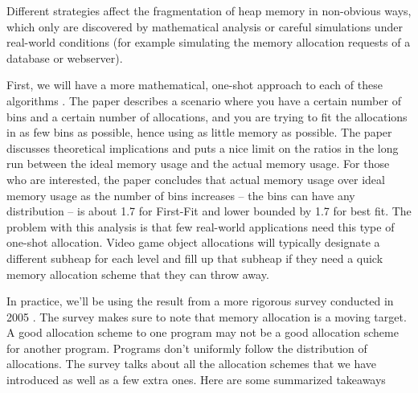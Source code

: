 Different strategies affect the fragmentation of heap memory in non-obvious ways, which only are discovered by mathematical analysis or careful simulations under real-world conditions (for example simulating the memory allocation requests of a database or webserver).

First, we will have a more mathematical, one-shot approach to each of these algorithms \cite{Garey:1972:WAM:800152.804907}.
The paper describes a scenario where you have a certain number of bins and a certain number of allocations, and you are trying to fit the allocations in as few bins as possible, hence using as little memory as possible.
The paper discusses theoretical implications and puts a nice limit on the ratios in the long run between the ideal memory usage and the actual memory usage.
For those who are interested, the paper concludes that actual memory usage over ideal memory usage as the number of bins increases -- the bins can have any distribution -- is about 1.7 for First-Fit and lower bounded by 1.7 for best fit.
The problem with this analysis is that few real-world applications need this type of one-shot allocation.
Video game object allocations will typically designate a different subheap for each level and fill up that subheap if they need a quick memory allocation scheme that they can throw away.

In practice, we'll be using the result from a more rigorous survey conducted in 2005 \cite{10.1007/3-540-60368-9_19}.
The survey makes sure to note that memory allocation is a moving target.
A good allocation scheme to one program may not be a good allocation scheme for another program.
Programs don't uniformly follow the distribution of allocations.
The survey talks about all the allocation schemes that we have introduced as well as a few extra ones.
Here are some summarized takeaways

